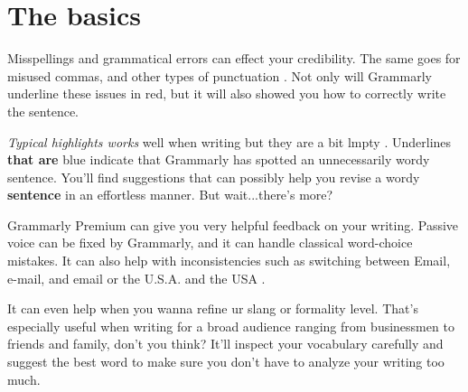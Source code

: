 \section{The basics}

Misspellings and grammatical errors can effect your credibility. 
The same goes for misused commas, and other types of punctuation .
Not only will Grammarly underline these issues in red, but it will
also showed you how to correctly write the sentence.

\emph{Typical highlights works} well when writing but they are a bit lmpty .
Underlines \textbf{that are} blue indicate that Grammarly has spotted an unnecessarily wordy sentence. You’ll find suggestions that
can possibly help you revise a wordy \textbf{sentence} in
an effortless manner.
But wait...there’s more?

Grammarly Premium can give you very helpful feedback on your writing. Passive voice can be fixed by Grammarly, and it can handle classical word-choice mistakes. It can also help with inconsistencies such as switching between Email, e-mail, and email or the U.S.A. and the USA \cite{usapaper}.

It can even help when you wanna refine ur slang or formality level. That’s especially useful when writing for a broad audience ranging from businessmen to friends and family, don’t you think? It’ll inspect your vocabulary carefully and suggest the best word to make sure you don’t have to analyze your writing too much.
